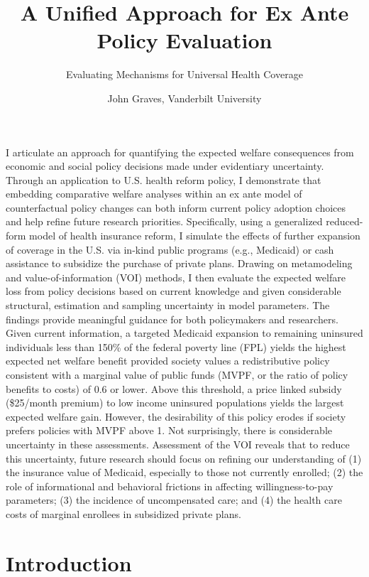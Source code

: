 \documentclass[
  10pt,
]{article}
\title{A Unified Approach for Ex Ante Policy Evaluation}
\subtitle{Evaluating Mechanisms for Universal Health Coverage}
\author{John Graves, Vanderbilt University}
\date{}
\begin{document}
\maketitle

\centering
\raggedright

\singlespacing

I articulate an approach for quantifying the expected welfare
consequences from economic and social policy decisions made under
evidentiary uncertainty. Through an application to U.S. health reform
policy, I demonstrate that embedding comparative welfare analyses within
an ex ante model of counterfactual policy changes can both inform
current policy adoption choices and help refine future research
priorities. Specifically, using a generalized reduced-form model of
health insurance reform, I simulate the effects of further expansion of
coverage in the U.S. via in-kind public programs (e.g., Medicaid) or
cash assistance to subsidize the purchase of private plans. Drawing on
metamodeling and value-of-information (VOI) methods, I then evaluate the
expected welfare loss from policy decisions based on current knowledge
and given considerable structural, estimation and sampling uncertainty
in model parameters. The findings provide meaningful guidance for both
policymakers and researchers. Given current information, a targeted
Medicaid expansion to remaining uninsured individuals less than 150\% of
the federal poverty line (FPL) yields the highest expected net welfare
benefit provided society values a redistributive policy consistent with
a marginal value of public funds (MVPF, or the ratio of policy benefits
to costs) of 0.6 or lower. Above this threshold, a price linked subsidy
(\$25/month premium) to low income uninsured populations yields the
largest expected welfare gain. However, the desirability of this policy
erodes if society prefers policies with MVPF above 1. Not surprisingly,
there is considerable uncertainty in these assessments. Assessment of
the VOI reveals that to reduce this uncertainty, future research should
focus on refining our understanding of (1) the insurance value of
Medicaid, especially to those not currently enrolled; (2) the role of
informational and behavioral frictions in affecting willingness-to-pay
parameters; (3) the incidence of uncompensated care; and (4) the health
care costs of marginal enrollees in subsidized private plans.

\doublespacing

\newpage

\hypertarget{introduction}{%
\section{Introduction}\label{introduction}}
\end{document}

